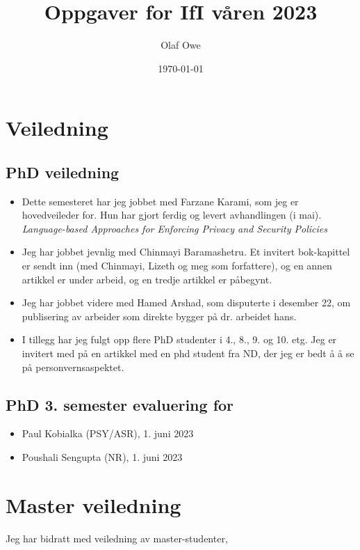 \documentclass[11pt]{article}
\author{Olaf Owe}
\date{\today}
\title{Oppgaver for IfI våren 2023}
\begin{document}
\maketitle



\section{Veiledning}
\label{sec-1}


\subsection{PhD veiledning}
\label{sec-1-1}
\begin{itemize}
\item Dette semesteret har  jeg jobbet med Farzane Karami,
som jeg er hovedveileder for. Hun har gjort  ferdig og levert
avhandlingen  (i mai).
\emph{Language-based Approaches for Enforcing Privacy and Security Policies}

\item Jeg har jobbet jevnlig med Chinmayi Baramashetru. Et invitert bok-kapittel
er sendt inn (med Chinmayi, Lizeth og meg som forfattere),
og en annen artikkel er under arbeid, og en tredje artikkel er påbegynt.

\item Jeg har jobbet videre med Hamed Arshad, som  disputerte i desember 22,
om publisering av arbeider som direkte bygger på dr. arbeidet hans.

\item I tillegg har jeg fulgt opp flere PhD studenter i 4.,
8., 9. og 10. etg.
Jeg er invitert med på en artikkel med en phd student fra ND, der
jeg er bedt å å se på personvernsaspektet.
\end{itemize}
\subsection{PhD 3. semester evaluering for}
\label{sec-1-2}

\begin{itemize}
\item Paul Kobialka (PSY/ASR), 1. juni 2023
\item Poushali Sengupta (NR), 1. juni 2023
\end{itemize}
\section{Master veiledning}
\label{sec-2}
Jeg har bidratt med veiledning av  master-studenter,
\end{document}
